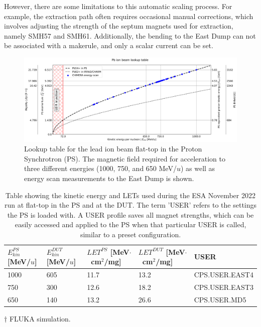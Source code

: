 \documentclass{cernatsnote}
\begin{document}
However, there are some limitations to this automatic scaling process. For example, the extraction path often requires occasional manual corrections, which involves adjusting the strength of the septum magnets used for extraction, namely SMH57 and SMH61. Additionally, the bending to the East Dump can not be associated with a makerule, and only a scalar current can be set.
\\

\begin{figure}[!htb]
\centering
\includegraphics[width=1.0\textwidth]{images/PS_BEAM_ENERGY/kinetic_energy_lookup_chimera.png}
\caption{Lookup table for the lead ion beam flat-top in the Proton Synchrotron (PS). The magnetic field required for acceleration to three different energies (1000, 750, and 650 MeV/$u$) as well as energy scan measurements to the East Dump is shown.}
\label{fig:lookup table}
\end{figure}

\begin{table}[!htbp]
\centering
\caption{Table showing the kinetic energy and LETs used during the ESA November 2022 run at flat-top in the PS and at the DUT. The term 'USER' refers to the settings the PS is loaded with. A USER profile saves all magnet strengths, which can be easily accessed and applied to the PS when that particular USER is called, similar to a preset configuration.}
\begin{threeparttable}
\label{tab:KE_table}
\begin{tabular}{@{}m{1.6cm}m{1.6cm}m{2.8cm}m{2.8cm}m{4cm}@{}}
\toprule
$E^{PS}_{kin}$ {[}MeV/$u${]} & $E^{DUT}_{kin}$\tnote{$\dagger$} [MeV/$u$] & $LET^{PS}$\tnote{$\dagger$} [MeV$\cdot$~cm$^2$/mg] & $LET^{DUT}$\tnote{$\dagger$} [MeV$\cdot$~cm$^2$/mg] & USER \\ \midrule
1000 & 605 & 11.7 & 13.2 & CPS.USER.EAST4 \\
750 & 300 & 12.6 & 18.2 & CPS.USER.EAST3 \\
650 & 140 & 13.2 & 26.6 & CPS.USER.MD5 \\ \bottomrule
\end{tabular}
\begin{tablenotes}
\item[$\dagger$] FLUKA simulation.
\end{tablenotes}
\end{threeparttable}
\end{table}
\end{document}
